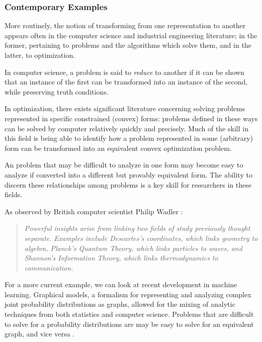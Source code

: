 \subsubsection{Contemporary Examples}

More routinely, the notion of transforming from one representation to another appears often in the computer science and industrial engineering literature; in the former, pertaining to problems and the algorithms which solve them, and in the latter, to optimization.

In computer science, a problem is said to \textit{reduce} to another if it can be shown that an instance of the first can be transformed into an instance of the second, while preserving truth conditions.

In optimization, there exists significant literature concerning solving problems represented in specific constrained (convex) forms: problems defined in these ways can be solved by computer relatively quickly and precisely.
Much of the skill in this field is being able to identify how a problem represented in some (arbitrary) form can be transformed into an equivalent convex optimization problem.

An problem that may be difficult to analyze in one form may become easy to analyze if converted into a different but provably equivalent form.
The ability to discern these relationships among problems is a key skill for researchers in these fields.

\bigskip

As observed by British computer scientist Philip Wadler \cite{wadler}: 

\begin{quotation}
\textit{
	Powerful insights arise from linking two fields of study previously thought separate.
	Examples include Descartes's coordinates, which links geometry to algebra, Planck's Quantum Theory, which links particles to waves, and Shannon's Information Theory, which links thermodynamics to communication.
	}
\end{quotation}

For a more current example, we can look at recent development in machine learning.
Graphical models, a formalism for representing and analyzing complex joint probability distributions as graphs, allowed for the mixing of analytic techniques from both statistics and computer science.
Problems that are difficult to solve for a probability distributions are may be easy to solve for an equivalent graph, and vice versa \citep{wainwright}.

